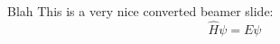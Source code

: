\begin{frame}{Blah}
  This is a very nice converted beamer slide:
  \begin{equation*}
    \hat{H} \psi = E \psi
  \end{equation*}
\end{frame}
